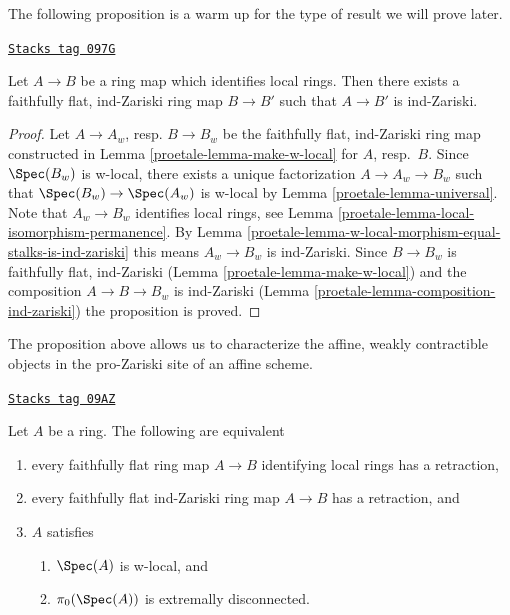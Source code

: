 The following proposition is a warm up for the type of result
we will prove later.

\begin{proposition}
\label{proetale-proposition-maps-wich-identify-local-rings}
\href{https://stacks.math.columbia.edu/tag/097G}{\texttt{Stacks tag 097G}}

Let $A \to B$ be a ring map which identifies local rings.
Then there exists a faithfully flat, ind-Zariski ring map
$B \to B'$ such that $A \to B'$ is ind-Zariski.
\end{proposition}

\begin{proof}

Let $A \to A_w$, resp. $B \to B_w$ be the faithfully flat, ind-Zariski ring
map constructed in Lemma \ref{proetale-lemma-make-w-local} for $A$, resp.\ $B$.
Since $\Spec(B_w)$ is w-local, there exists a unique factorization
$A \to A_w \to B_w$ such that $\Spec(B_w) \to \Spec(A_w)$ is w-local
by Lemma \ref{proetale-lemma-universal}. Note that $A_w \to B_w$ identifies
local rings, see
Lemma \ref{proetale-lemma-local-isomorphism-permanence}.
By Lemma \ref{proetale-lemma-w-local-morphism-equal-stalks-is-ind-zariski}
this means $A_w \to B_w$ is ind-Zariski. Since $B \to B_w$ is
faithfully flat, ind-Zariski (Lemma \ref{proetale-lemma-make-w-local})
and the composition $A \to B \to B_w$ is ind-Zariski
(Lemma \ref{proetale-lemma-composition-ind-zariski})
the proposition is proved.
\end{proof}

The proposition above allows us to characterize the affine, weakly contractible
objects in the pro-Zariski site of an affine scheme.

\begin{lemma}
\label{proetale-lemma-w-local-extremally-disconnected}
\href{https://stacks.math.columbia.edu/tag/09AZ}{\texttt{Stacks tag 09AZ}}

Let $A$ be a ring. The following are equivalent
\begin{enumerate}
\item every faithfully flat ring map $A \to B$ identifying local rings
has a retraction,
\item every faithfully flat ind-Zariski ring map $A \to B$ has a retraction, and
\item $A$ satisfies
\begin{enumerate}
\item $\Spec(A)$ is w-local, and
\item $\pi_0(\Spec(A))$ is extremally disconnected.
\end{enumerate}
\end{enumerate}
\end{lemma}

